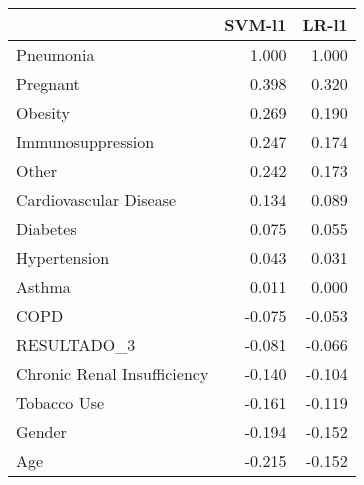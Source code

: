 \begin{tabular}{lrr}
\toprule
{} &  SVM-l1 &  LR-l1 \\
\midrule
Pneumonia                   &   1.000 &  1.000 \\
Pregnant                    &   0.398 &  0.320 \\
Obesity                     &   0.269 &  0.190 \\
Immunosuppression           &   0.247 &  0.174 \\
Other                       &   0.242 &  0.173 \\
Cardiovascular Disease      &   0.134 &  0.089 \\
Diabetes                    &   0.075 &  0.055 \\
Hypertension                &   0.043 &  0.031 \\
Asthma                      &   0.011 &  0.000 \\
COPD                        &  -0.075 & -0.053 \\
RESULTADO\_3                 &  -0.081 & -0.066 \\
Chronic Renal Insufficiency &  -0.140 & -0.104 \\
Tobacco Use                 &  -0.161 & -0.119 \\
Gender                      &  -0.194 & -0.152 \\
Age                         &  -0.215 & -0.152 \\
\bottomrule
\end{tabular}
